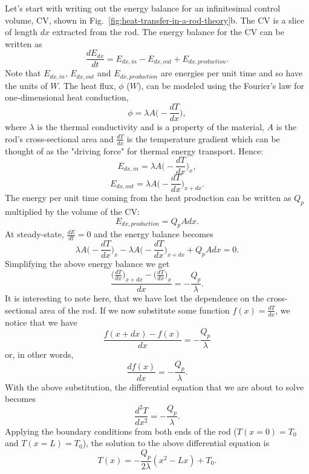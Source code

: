 Let's start with writing out the energy balance for an infinitesimal control volume, CV, shown in Fig.~\ref{fig:heat-transfer-in-a-rod-theory}b. The CV is a slice of length $dx$ extracted from the rod. The energy balance for the CV can be written as
\begin{equation}
\frac{dE_{dx}}{dt} = E_{dx, in} - E_{dx, out} + E_{dx, production} .
\end{equation}
Note that $E_{dx, in}$, $E_{dx, out}$ and $E_{dx, production}$ are energies per unit time and so have the units of $W$. The heat flux, $\phi$ ($W$), can be modeled using the Fourier's law for one-dimensional heat conduction,
\begin{equation}
\phi = \lambda A \Big(- \frac{dT}{dx} \Big),
\label{eq:fourier}
\end{equation}
where $\lambda$ is the thermal conductivity and is a property of the material, $A$ is the rod's cross-sectional area and $\frac{dT}{dx}$ is the temperature gradient which can be thought of as the "driving force" for thermal energy transport. Hence:
\begin{equation}
E_{dx, in} = \lambda A \Big(- \frac{dT}{dx} \Big)_x ,
\end{equation}
\begin{equation}
E_{dx, out} = \lambda A \Big(- \frac{dT}{dx} \Big)_{x + dx} .
\end{equation}
The energy per unit time coming from the heat production can be written as $Q_p$ multiplied by the volume of the CV:
\begin{equation}
E_{dx, production} = Q_p A dx .
\end{equation}
At steady-state, $\frac{dE}{dt} = 0$ and the energy balance becomes
\begin{equation}
\lambda A \Big(- \frac{dT}{dx} \Big)_x - \lambda A \Big(- \frac{dT}{dx} \Big)_{x + dx} + Q_p A dx = 0 .
\end{equation}
Simplifying the above energy balance we get
\begin{equation*}
\frac{\Big(\frac{dT}{dx} \Big)_{x + dx} - \Big(\frac{dT}{dx} \Big)_x  }{dx} = - \frac{Q_p}{\lambda} .
\end{equation*}
It is interesting to note here, that we have lost the dependence on the cross-sectional area of the rod.
If we now substitute some function $f(x) = \frac{dT}{dx}$, we notice that we have
\begin{equation*}
\frac{f(x + dx) - f(x)}{dx} = - \frac{Q_p}{\lambda}
\end{equation*}
or, in other words,
\begin{equation}
\frac{df(x)}{dx} = - \frac{Q_p}{\lambda} .
\end{equation}
With the above substitution, the differential equation that we are about to solve becomes
\begin{equation}
\frac{d^2T}{dx^2} = - \frac{Q_p}{\lambda} .
\end{equation}
Applying the boundary conditions from both ends of the rod ($T(x=0) = T_0$ and $T(x=L) = T_0$), the solution to the above differential equation is
\begin{equation}
T(x) = - \frac{Q_p}{2 \lambda} (x^2 - Lx) + T_0 .
\label{eq:solution}
\end{equation}


